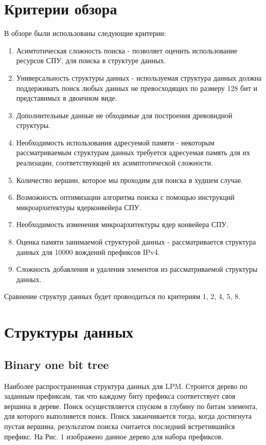 \documentclass[a4peper, 12pt, titlepage, finall]{extreport}
\begin{document}
    \section{Критерии обзора}
        В обзоре были использованы следующие критерии:
        \begin{enumerate}
            \item Асимтотическая сложность поиска - позволяет оценить использование ресурсов СПУ, для поиска в структуре данных.
            \item Универсальность структуры данных - используемая структура данных должна поддерживать поиск любых данных не превосходящих по размеру 128 бит и представимых в двоичном виде.
            \item Дополнительные данные не обходимые для построения древовидной структуры.
            \item Необходимость использования адресуемой памяти - некоторым рассматриваемым структурам данных требуется адресуемая память для их реализации, соответствующей их асимптотической сложности.
            \item Количество вершин, которое мы проходим для поиска в худшем случае.
            \item Возможность оптимизации алгоритма поиска с помощью инструкций микроархитектуры ядерконвейера СПУ.
            \item Необходимость изменения микроархитектуры ядер конвейера СПУ.
            \item Оценка памяти занимаемой структурой данных - рассматривается структура данных для 10000 вождений префиксов IPv4.
            \item Сложность добавления и удаления элементов из рассматриваемой структуры данных.
        \end{enumerate}

        Сравнение структур данных будет провоодиться по критериям 1, 2, 4, 5, 8.

    
    \newpage

    \section{Структуры данных}
        \subsection{Binary one bit tree}
            Наиболее распространенная структура данных для LPM. Строится дерево по заданным префиксам, 
            так что каждому биту префикса соответствует своя вершина в дереве. 
            Поиск осуществляется спуском в глубину по битам элемента, для которого выполняется поиск. 
            Поиск заканчивается тогда, когда достигнута пустая вершина, результатом поиска считается последний встретившийся префикс. 
            На Рис. 1 изображено данное дерево для набора префиксов.
\end{document}
